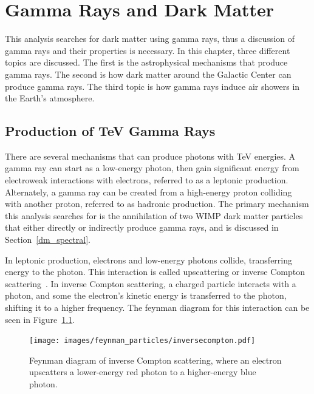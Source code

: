 \cleartooddpage[\thispagestyle{empty}]

\newcommand{\Lim}[1]{\raisebox{0.5ex}{\scalebox{0.8}{$\displaystyle \lim_{#1}\;$}}}
\renewcommand{\labelitemi}{\textbullet}
\newcommand{\pip}[1]{$\pi^{+}$}
\newcommand{\pim}[1]{$\pi^{-}$}
\newcommand{\pio}[1]{$\pi^{0}$}
\newcommand{\sv}{\left < \sigma v \right >}

\chapter{Gamma Rays and Dark Matter}\label{ch_gamma}


This analysis searches for dark matter using gamma rays, thus a discussion of gamma rays and their properties is necessary.
In this chapter, three different topics are discussed.
The first is the astrophysical mechanisms that produce gamma rays.
The second is how dark matter around the Galactic Center can produce gamma rays.
The third topic is how gamma rays induce air showers in the Earth's atmosphere.

\section{Production of TeV Gamma Rays}

  There are several mechanisms that can produce photons with TeV energies.
  A gamma ray can start as a low-energy photon, then gain significant energy from electroweak interactions with electrons, referred to as a leptonic production.
  Alternately, a gamma ray can be created from a high-energy proton colliding with another proton, referred to as hadronic production.
  The primary mechanism this analysis searches for is the annihilation of two WIMP dark matter particles that either directly or indirectly produce gamma rays, and is discussed in Section~\ref{dm_spectral}.

  In leptonic production, electrons and low-energy photons collide, transferring energy to the photon.
  This interaction is called upscattering or inverse Compton scattering~\cite{compton_effect}.
  In inverse Compton scattering, a charged particle interacts with a photon, and some the electron's kinetic energy is transferred to the photon, shifting it to a higher frequency.
  The feynman diagram for this interaction can be seen in Figure~\ref{fig:inv_compt_feyn}.
  
  \begin{figure}[ht]
    \centering
    \texttt{[image: images/feynman\_particles/inversecompton.pdf]}
    \caption[Inverse Compton Scattering Feynman Diagram]{
      Feynman diagram of inverse Compton scattering, where an electron upscatters a lower-energy red photon to a higher-energy blue photon.
    }
    \label{fig:inv_compt_feyn}
  \end{figure}
  \FloatBarrier
  
